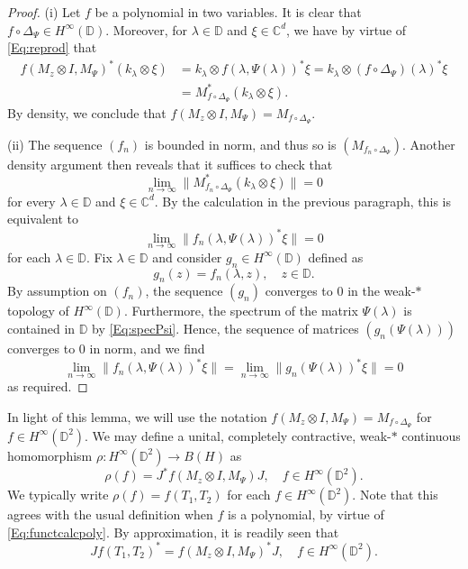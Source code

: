 \documentclass[10pt]{amsart}
\newcommand{\bC}{{\mathbb{C}}}
\newcommand{\bD}{{\mathbb{D}}}
\theoremstyle{definition}
\begin{document}
\begin{proof}
(i) Let $f$ be a polynomial in two variables. It is clear that $f\circ \Delta_\Psi\in H^\infty(\bD)$. Moreover, for $\lambda\in \bD$ and $\xi\in \bC^d$,  we have by virtue of \eqref{Eq:reprod} that
\begin{align*}
f(M_z\otimes I,M_\Psi)^*(k_\lambda\otimes \xi)&=k_\lambda \otimes f(\lambda,\Psi(\lambda))^*\xi=k_\lambda \otimes (f\circ \Delta_\Psi)(\lambda)^* \xi\\
&=M_{f\circ \Delta_\Psi}^*(k_\lambda\otimes \xi).
\end{align*}
By density, we conclude that $f(M_z\otimes I,M_\Psi)=M_{f\circ \Delta_\Psi}.$

(ii) The sequence $(f_n)$ is bounded in norm, and thus so is $(M_{f_n\circ \Delta_\Psi})$. Another density argument then reveals that it suffices to check that 
\[
\lim_{n\to\infty}\|M^*_{f_n\circ \Delta_\Psi} (k_\lambda\otimes \xi)\| =0
\]
for every $\lambda\in \bD$ and $\xi\in \bC^d$. By the calculation in the previous paragraph, this is equivalent to
\[
\lim_{n\to\infty}\|f_n(\lambda,\Psi(\lambda))^* \xi\| =0
\]
for each $\lambda\in \bD$. Fix $\lambda\in \bD$ and consider $g_n\in H^\infty(\bD)$ defined as
\[
g_n(z)=f_n(\lambda,z), \quad z\in \bD.
\]
By assumption on $(f_n)$, the sequence $(g_n)$ converges to $0$ in the weak-$*$ topology of $H^\infty(\bD)$. Furthermore, the spectrum of the matrix $\Psi(\lambda)$ is contained in $\bD$ by \eqref{Eq:specPsi}. Hence, the sequence of matrices $(g_n(\Psi(\lambda)))$ converges to $0$ in norm, and we find
\[
\lim_{n\to\infty}\|f_n(\lambda,\Psi(\lambda))^* \xi\| =\lim_{n\to\infty}\|g_n(\Psi(\lambda))^* \xi\|=0
\]
as required.
\end{proof}
In light of this lemma, we will use the notation $f(M_z\otimes I,M_\Psi)=M_{f\circ \Delta_\Psi}$ for $f\in H^\infty(\bD^2)$.
We may  define a unital, completely contractive, weak-$*$ continuous homomorphism $\rho:H^\infty(\bD^2)\to B(H)$ as
\begin{equation}\label{Eq:functcalcT}
\rho(f)=J^* f(M_z\otimes I,M_\Psi)J, \quad f\in H^\infty(\bD^2).
\end{equation}
We typically write $\rho(f)=f(T_1,T_2)$ for each $f\in H^\infty(\bD^2)$.  Note that this agrees with the usual definition when $f$ is a polynomial, by virtue of \eqref{Eq:functcalcpoly}. By approximation, it is readily seen that
\begin{equation}\label{Eq:functcalcTcoext}
Jf(T_1,T_2)^*=f(M_z\otimes I,M_\Psi)^* J, \quad f\in H^\infty(\bD^2).
\end{equation}
\end{document}
